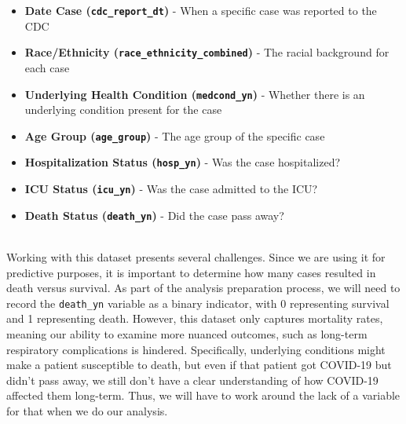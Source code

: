 \documentclass{article}
\begin{document}
\begin{itemize}
    \item \textbf{Date Case (\texttt{cdc\_report\_dt})} - When a specific case was reported to the CDC
\end{itemize}
\begin{itemize}
    \item \textbf{Race/Ethnicity (\texttt{race\_ethnicity\_combined})} - The racial background for each case
\end{itemize}
\begin{itemize}
    \item \textbf{Underlying Health Condition (\texttt{medcond\_yn})}  - Whether there is an underlying condition present for the case
\end{itemize}
\begin{itemize}
    \item \textbf{Age Group (\texttt{age\_group})} - The age group of the specific case
\end{itemize}
\begin{itemize}
    \item \textbf{Hospitalization Status (\texttt{hosp\_yn})} - Was the case hospitalized?
\end{itemize}
\begin{itemize}
    \item \textbf{ICU Status (\texttt{icu\_yn})} - Was the case admitted to the ICU?
\end{itemize}
\begin{itemize}
    \item \textbf{Death Status (\texttt{death\_yn})} - Did the case pass away?
\end{itemize}
\\
Working with this dataset presents several challenges. Since we are using it for predictive purposes, it is important to determine how many cases resulted in death versus survival. As part of the analysis preparation process, we will need to record the \texttt{death\_yn} variable as a binary indicator, with 0 representing survival and 1 representing death. However, this dataset only captures mortality rates, meaning our ability to examine more nuanced outcomes, such as long-term respiratory complications is hindered. Specifically, underlying conditions might make a patient susceptible to death, but even if that patient got COVID-19 but didn't pass away, we still don't have a clear understanding of how COVID-19 affected them long-term. Thus, we will have to work around the lack of a variable for that when we do our analysis. \\
\end{document}
